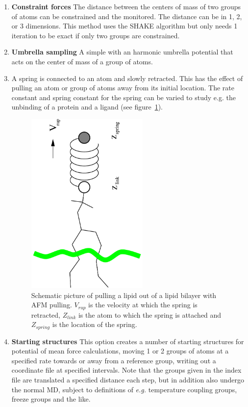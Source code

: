 \begin{enumerate}
\item{\textbf{Constraint forces}} The distance between the centers of
mass of two groups of atoms can be constrained and the 
 monitored.
The distance can be in 1, 2, or 3 dimensions. This method
uses the SHAKE algorithm but only needs 1 iteration to be
exact if only two groups are constrained. 
\item{\textbf{Umbrella sampling}} A simple
 with an
harmonic umbrella potential that acts on the center of mass of a group
of atoms.
\item{\textbf{}} A spring is connected to an atom and
slowly retracted. This has the effect of pulling an atom or group of
atoms away from its initial location. The rate constant and spring
constant for the spring can be varied to study e.g. the unbinding of a
protein and a ligand (see figure~\ref{fi:pull}). 
\begin{figure}
\centerline{\includegraphics[width=6cm,angle=270]{plots/pull}}
\caption{Schematic picture of pulling a lipid out of a lipid bilayer
with AFM pulling. $V_{rup}$ is the velocity at which the spring is
retracted, $Z_{link}$ is the atom to which the spring is attached and
$Z_{spring}$ is the location of the spring.}
\label{fi:pull} 
\end{figure}   
\item{\textbf{Starting structures}} This option creates a number of
starting structures for potential of mean force calculations, moving 1
or 2 groups of atoms at a specified rate towards or away from a
reference group, writing out a coordinate file at specified intervals.
Note that the groups given in the index file are translated a
specified distance each step, but in addition also undergo the normal
MD, subject to definitions of \emph{e.g.} temperature coupling groups, freeze
groups and the like.
\end{enumerate}

